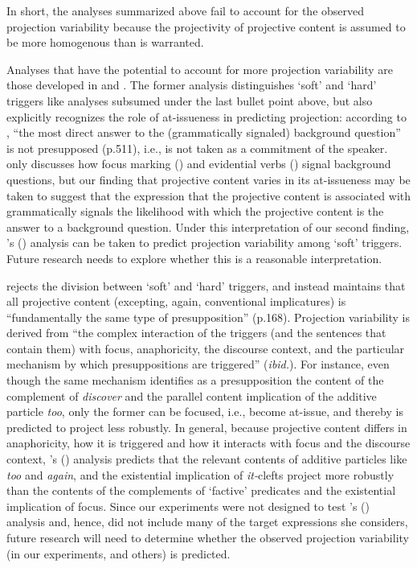 \documentclass[11pt,fleqn]{article}
\newcommand{\6}{\mbox{$[\hspace*{-.6mm}[$}}
\newcommand{\9}{\mbox{$]\hspace*{-.6mm}]$}}
\newcommand{\citetpos}[1]{\citeauthor{#1}'s (\citeyear{#1})}
\begin{document}
In short, the analyses summarized above fail to account for the observed projection variability because the projectivity of projective content is assumed to be more homogenous than is warranted. 

Analyses that have the potential to account for more projection variability are those developed in \citealt{abrusan2011} and \citealt{abrusan2016}. The former analysis distinguishes `soft' and `hard' triggers like analyses subsumed under the last bullet point above, but also explicitly recognizes the role of at-issueness in predicting projection: according to \citealt{abrusan2011}, ``the most direct answer to the (grammatically signaled) background question'' is not presupposed (p.511), i.e., is not taken as a commitment of the speaker.  \citet{abrusan2011} only discusses how focus marking (\citealt{beaver-belly}) and evidential verbs (\citealt{simons07}) signal background questions, but our finding that projective content varies in its at-issueness may be taken to suggest that the expression that the projective content is associated with grammatically signals the likelihood with which the projective content is the answer to a background question. Under this interpretation of our second finding, \citetpos{abrusan2011} analysis can be taken to predict projection variability among `soft' triggers. Future research needs to explore whether this is a reasonable interpretation.

\citet{abrusan2016} rejects the division between `soft' and `hard' triggers, and instead maintains that all projective content (excepting, again, conventional implicatures) is ``fundamentally the same type of presupposition'' (p.168). Projection variability is derived from ``the complex interaction of the triggers (and the sentences that contain them) with focus, anaphoricity, the discourse context, and the particular mechanism by which presuppositions are triggered'' ({\em ibid.}). For instance, even though the same mechanism identifies as a presupposition the content of the complement of {\em discover} and the parallel content implication of the additive particle {\em too}, only the former can be focused, i.e., become at-issue, and thereby is predicted to project less robustly. In general, because projective content differs in anaphoricity, how it is triggered and how it interacts with focus and the discourse context, \citetpos{abrusan2016} analysis predicts that the relevant contents of additive particles like {\em too} and {\em again}, and the existential implication of {\em it-}clefts project more robustly than the contents of the complements of `factive' predicates and the existential implication of focus. Since our experiments were not designed to test \citetpos{abrusan2016} analysis and, hence, did not include many of the target expressions she considers, future research will need to determine whether the observed projection variability (in our experiments, and others) is predicted.
\end{document}
